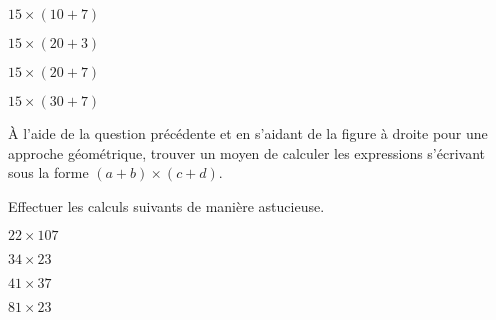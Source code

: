 \begin{multicols}{4}
    $15\times (10+7)$

    $15\times (20+3)$

    $15\times (20+7)$

    $15\times (30+7)$
\end{multicols}
\vspace*{-1em}
\begin{minipage}[m]{0.6\textwidth}
    \cnt À l'aide de la question précédente et en s'aidant de la figure à droite pour une approche géométrique, trouver un moyen de calculer les expressions s'écrivant sous la forme $(a+b)\times (c+d)$.

    \vspace*{1em}

    \cnt Effectuer les calculs suivants de manière astucieuse.
\end{minipage}
\hfill
\begin{minipage}[m]{0.35\textwidth}
    \begin{figure}[H]
        \centering
    \end{figure}
\end{minipage}

\begin{multicols}{4}
    $22\times 107$

    $34\times 23$

    $41\times 37$

    $81\times 23$
\end{multicols}